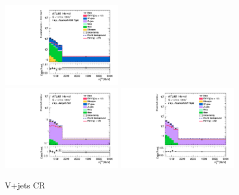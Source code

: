 \begin{figure}[H]
    \includegraphics[width=0.45\textwidth]{figures/PostFit/Region_disttagMjj_DCRVjetTight_BMin0_T0_Y6051_incTag1_J2_L1_incJet1_GlobalFit_unconditionnal_mu1log}
    \\
     \includegraphics[width=0.45\textwidth]{figures/PostFit/Region_distMTagMerJets_DCRVjet_BMin0_J0_incJet1_L2_T0_incFat1_Y6051_incTag1_Fat1_GlobalFit_unconditionnal_mu1log}
      \includegraphics[width=0.45\textwidth]{figures/PostFit/Region_distMTagResJets_DCRVjetFid_BMin0_T0_Y6051_incTag1_J2_L2_incJet1_GlobalFit_unconditionnal_mu1log}
    \caption{V+jets CR}
    \label{fig:postCR}
\end{figure}

